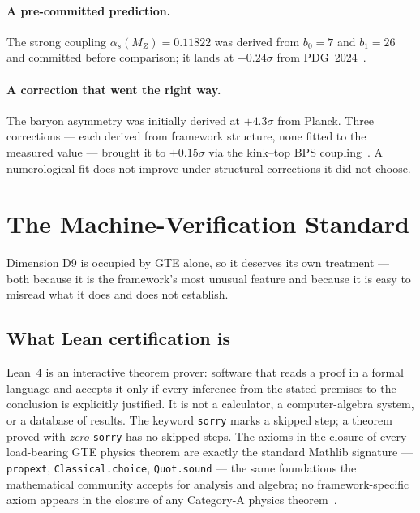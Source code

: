 \documentclass[11pt]{article}
\begin{document}
\paragraph{A pre-committed prediction.}  The strong coupling
$\alpha_s(M_Z) = 0.11822$ was derived from $b_0 = 7$ and $b_1 = 26$ and committed
before comparison; it lands at $+0.24\sigma$ from PDG~2024~\cite{SpivackSM}.

\paragraph{A correction that went the right way.}  The baryon asymmetry was
initially derived at $+4.3\sigma$ from Planck.  Three corrections --- each derived
from framework structure, none fitted to the measured value --- brought it to
$+0.15\sigma$ via the kink--top BPS coupling~\cite{SpivackGTECosmology}.  A
numerological fit does not improve under structural corrections it did not choose.

\section{The Machine-Verification Standard}
\label{sec:lean}

Dimension D9 is occupied by GTE alone, so it deserves its own treatment --- both
because it is the framework's most unusual feature and because it is easy to
misread what it does and does not establish.

\subsection{What Lean certification is}

Lean~4 is an interactive theorem prover: software that reads a proof in a formal
language and accepts it only if every inference from the stated premises to the
conclusion is explicitly justified.  It is not a calculator, a computer-algebra
system, or a database of results.  The keyword \texttt{sorry} marks a skipped
step; a theorem proved with \emph{zero} \texttt{sorry} has no skipped steps.  The
axioms in the closure of every load-bearing GTE physics theorem are exactly the
standard Mathlib signature --- \texttt{propext}, \texttt{Classical.choice},
\texttt{Quot.sound} --- the same foundations the mathematical community accepts for
analysis and algebra; no framework-specific axiom appears in the closure of any
Category-A physics theorem~\cite{SpivackGTECompleteFramework}.
\end{document}
